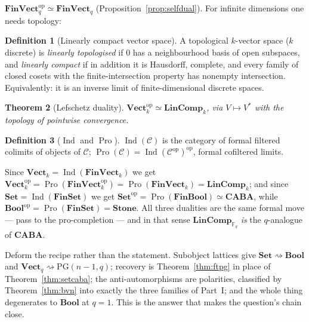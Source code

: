\documentclass[11pt,a4paper]{article}
\newtheorem{theorem}{Theorem}[section]
\theoremstyle{definition}
\newtheorem{definition}[theorem]{Definition}
\theoremstyle{remark}
\newcommand{\FF}{\mathbb{F}}
\newcommand{\dual}[1]{#1^{*}}
\newcommand{\cat}[1]{\mathbf{#1}}
\newcommand{\Set}{\cat{Set}}
\newcommand{\FinSet}{\cat{FinSet}}
\newcommand{\Bool}{\cat{Bool}}
\newcommand{\FinBool}{\cat{FinBool}}
\newcommand{\CABA}{\cat{CABA}}
\newcommand{\Vect}{\cat{Vect}}
\newcommand{\FinVect}{\cat{FinVect}}
\newcommand{\Stone}{\cat{Stone}}
\newcommand{\LinComp}{\cat{LinComp}}
\newcommand{\PG}{\mathrm{PG}}
\newcommand{\op}{\mathrm{op}}
\DeclareMathOperator{\Ind}{Ind}
\DeclareMathOperator{\Pro}{Pro}
\begin{document}
\begin{description}[leftmargin=1.8em,style=nextline]
\item[(1) The literal answer: linear algebra is self-dual.]
$\FinVect_q^{\op} \simeq \FinVect_q$ (Proposition~\ref{prop:selfdual}). For infinite
dimensions one needs topology:

\begin{definition}[Linearly compact vector space]
A topological $k$-vector space ($k$ discrete) is \emph{linearly topologised} if $0$ has a
neighbourhood basis of open subspaces, and \emph{linearly compact} if in addition it is
Hausdorff, complete, and every family of closed cosets with the finite-intersection property
has nonempty intersection. Equivalently: it is an inverse limit of finite-dimensional discrete
spaces.
\end{definition}

\begin{theorem}[Lefschetz duality]
$\Vect_k^{\op} \simeq \LinComp_k$, via $V \mapsto \dual{V}$ with the topology of pointwise
convergence.
\end{theorem}

\begin{definition}[$\Ind$ and $\Pro$]
$\Ind(\mathcal{C})$ is the category of formal filtered colimits of objects of $\mathcal{C}$;
$\Pro(\mathcal{C}) = \Ind(\mathcal{C}^{\op})^{\op}$, formal cofiltered limits.
\end{definition}

Since $\Vect_k = \Ind(\FinVect_k)$ we get $\Vect_k^{\op} = \Pro(\FinVect_k^{\op}) =
\Pro(\FinVect_k) = \LinComp_k$; and since $\Set = \Ind(\FinSet)$ we get
$\Set^{\op} = \Pro(\FinBool) \simeq \CABA$, while $\Bool^{\op} = \Pro(\FinSet) = \Stone$. All
three dualities are the same formal move --- pass to the pro-completion --- and in that sense
$\LinComp_{\FF_q}$ \emph{is} the $q$-analogue of $\CABA$.

\item[(2) The structural answer: projective geometry.]
Deform the recipe rather than the statement. Subobject lattices give
$\Set \rightsquigarrow \Bool$ and $\Vect_q \rightsquigarrow \PG(n-1,q)$; recovery is
Theorem~\ref{thm:ftpg} in place of Theorem~\ref{thm:setcaba}; the anti-automorphisms are
polarities, classified by Theorem~\ref{thm:bvn} into exactly the three families of Part~I;
and the whole thing degenerates to $\Bool$ at $q = 1$. This is the answer that makes the
question's chain close.


\end{description}
\end{document}
